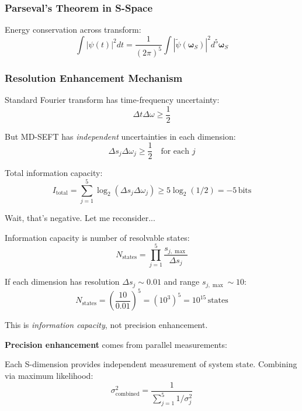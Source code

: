 \documentclass[11pt,onecolumn]{article}
\begin{document}
\subsubsection{Parseval's Theorem in S-Space}

Energy conservation across transform:
\begin{equation}
\int |\psi(t)|^2 dt = \frac{1}{(2\pi)^5} \int |\tilde{\psi}(\boldsymbol{\omega}_S)|^2 d^5\boldsymbol{\omega}_S
\end{equation}

\subsubsection{Resolution Enhancement Mechanism}

Standard Fourier transform has time-frequency uncertainty:
\begin{equation}
\Delta t \Delta \omega \geq \frac{1}{2}
\end{equation}

But MD-SEFT has \textit{independent} uncertainties in each dimension:
\begin{equation}
\Delta s_j \Delta \omega_j \geq \frac{1}{2} \quad \text{for each } j
\end{equation}

Total information capacity:
\begin{equation}
I_{\text{total}} = \sum_{j=1}^{5} \log_2(\Delta s_j \Delta \omega_j) \geq 5 \log_2(1/2) = -5\,\text{bits}
\end{equation}

Wait, that's negative. Let me reconsider...

Information capacity is number of resolvable states:
\begin{equation}
N_{\text{states}} = \prod_{j=1}^{5} \frac{s_{j,\max}}{\Delta s_j}
\end{equation}

If each dimension has resolution $\Delta s_j \sim 0.01$ and range $s_{j,\max} \sim 10$:
\begin{equation}
N_{\text{states}} = \left(\frac{10}{0.01}\right)^5 = (10^3)^5 = 10^{15}\,\text{states}
\end{equation}

This is \textit{information capacity}, not precision enhancement.

\textbf{Precision enhancement} comes from parallel measurements:

Each S-dimension provides independent measurement of system state. Combining via maximum likelihood:
\begin{equation}
\sigma_{\text{combined}}^2 = \frac{1}{\sum_{j=1}^{5} 1/\sigma_j^2}
\end{equation}
\end{document}
